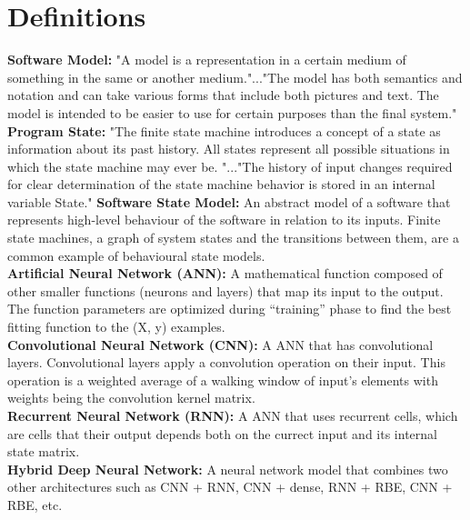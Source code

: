 \section{Definitions}
\textbf{Software Model:} "A model is a representation in a certain medium of something in the same or another medium."..."The model has both semantics and notation and can take various forms that include both pictures and text. The model is intended to be easier to use for certain purposes than the final system." \cite{10.5555/993859} \\
\textbf{Program State:} "The finite state machine introduces a concept of a state as information about its past history. All states represent all possible situations in which
the state machine may ever be. "..."The history of input changes required for clear determination of the state machine behavior is stored in an internal variable State."\cite{2006Mswf}
\textbf{Software State Model:} An abstract model of a software that represents high-level behaviour of the software in relation to its inputs. Finite state machines, a graph of system states and the transitions between them, are a common example of behavioural state models. \\
\textbf{Artificial Neural Network (ANN):} A mathematical function composed of other smaller functions (neurons and layers) that map its input to the output. The function parameters are optimized during ``training'' phase to find the best fitting function to the (X, y) examples. \cite{Goodfellow-et-al-2016}\\
\textbf{Convolutional Neural Network (CNN):} A ANN that has convolutional layers. Convolutional layers apply a convolution operation on their input. This operation is a weighted average of a walking window of input's elements with weights being the convolution kernel matrix.\\
\textbf{Recurrent Neural Network (RNN):} A ANN that uses recurrent cells, which are cells that their output depends both on the currect input and its internal state matrix.\\
\textbf{Hybrid Deep Neural Network:} A neural network model that combines two other architectures such as CNN + RNN, CNN + dense, RNN + RBE, CNN + RBE, etc.\\
